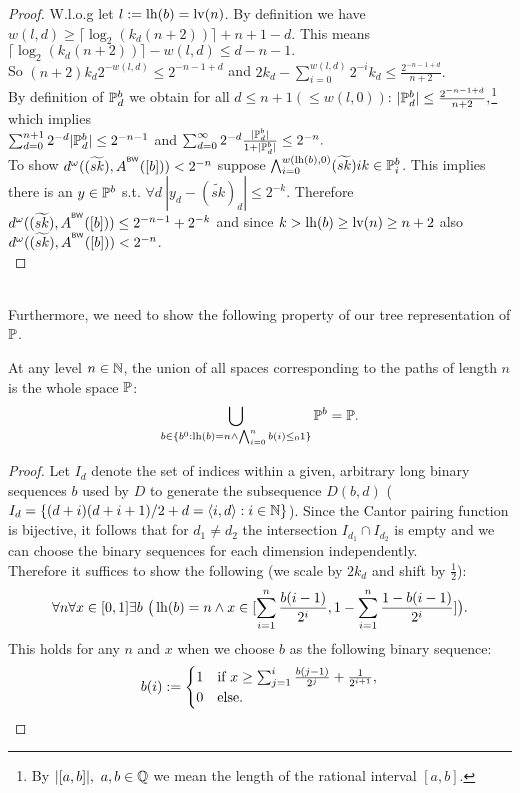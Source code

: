 \begin{proof}
\newcommand{\x}{\lceil\log_2(k_d(n+2))\rceil} 
W.l.o.g let $l:=\operatorname{lh}(b)=\mathrm {lv}(n)$.
By definition we have $w(l,d)\geq\x+n+1-d$. This means
$
\x-w(l,d)\leq d-n-1.
$\\
So $(n+2)k_d2^{-w(l,d)}\leq 2^{-n-1+d}$ and
$
2k_d-\sum_{i=0}^{w(l,d)}2^{-i}k_d\leq \frac{2^{-n-1+d}}{n+2}.
$\\
By definition of $\mathbb{P}^b_d$ we obtain for all $d\leq n+1 (\leq w(l,0))$:
$
|\mathbb{P}^b_d|\leq \frac{2^{-n-1+d}}{n+2},
$\footnote{
By $|[a,b]|,\ a,b\in\QQ$ we mean the length of the rational interval $[a,b]$.
}
which implies\\
$
\sum^{n+1}_{d=0}2^{-d}|\mathbb{P}^b_d|\leq 2^{-n-1}
$
and 
$
\sum^{\infty}_{d=0}2^{-d}\frac{|\mathbb{P}^b_d|}{1+|\mathbb{P}^b_d|} \leq 2^{-n}.
$\\
To show $d^\omega((\widetilde{sk}),A^{^{\textsf{\upshape BW}}}([b]))<2^{-n}$ suppose 
$\bigwedge_{i=0}^{w(\operatorname{lh}(b),0)} (\widetilde{sk})ik\in \mathbb{P}^b_i$. This implies
there is an $y\in\mathbb{P}^b$ s.t. $\forall d\ |y_d-(\widetilde{sk})_d|\leq 2^{-k}$. Therefore
$d^\omega((\widetilde{sk}),A^{^{\textsf{\upshape BW}}}([b])) \leq 2^{-n-1}+2^{-k}$ and since
$k>\operatorname{lh}(b)\geq \mathrm {lv}(n) \geq n+2$ also $d^\omega((\widetilde{sk}),A^{^{\textsf{\upshape BW}}}([b]))<2^{-n}$.\\
\end{proof}\\
Furthermore, we need to show the following property of our tree representation 
of $\mathbb{P}$.
\begin{lemma}\label{l:split}
At any level $n\in\mathbb{N}$, the union of all spaces corresponding to the 
paths of length $n$ is the whole space $\mathbb{P}$:
\[ \bigcup_{b\in\{b^0:\operatorname{lh}(b)=n\wedge 
\bigwedge_{i=0}^{n}b(i)\leq_0 1\}}\mathbb{P}^b = \mathbb{P}.
\]
\end{lemma}
\begin{proof}
Let $I_d$ denote the set of indices within a given, arbitrary long binary 
sequences $b$ used by $D$ to generate the subsequence $D(b,d)$ ( $I_d = 
\{ (d+i)(d+i+1)/2+d = \langle i,d\rangle : i\in\mathbb{N} \}$).
Since the Cantor pairing function is bijective, it follows that
for $d_1 \neq d_2$ the intersection $I_{d_1}\cap I_{d_2}$ is empty and we 
can choose the binary sequences
for each dimension independently. \\
Therefore
it suffices to show the following (we scale by $2k_d$ and shift by 
$\frac 1 2$):
\[
 \forall n\forall x\in [0,1]\exists b\ \big(\lh(b)=n\wedge x\in
 [\sum_{i=1}^n\frac{b(i-1)}{2^i}, 1-\sum_{i=1}^{n}\frac{1-b(i-1)}{2^i}]
 \big).
\]
This holds for any $n$ and $x$ when we choose $b$ as the following binary sequence:
\[
b(i):=\begin{cases}
1&\text{if}\ x \geq \sum_{j=1}^i\frac{b(j-1)}{2^{j}}+\frac1{2^{i+1}},\\
0&\text{else}.
\end{cases}
\]
\end{proof}

